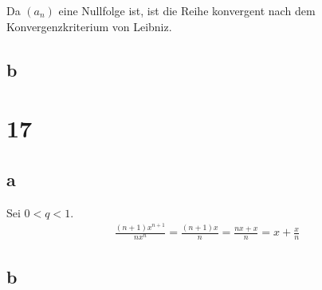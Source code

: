\documentclass[a4paper,10pt]{article}
\begin{document}
Da $(a_n)$ eine Nullfolge ist, ist die Reihe konvergent nach dem Konvergenzkriterium von Leibniz.

\subsection*{b}

\section*{17}

\subsection*{a}

Sei $0 < q < 1$.
\begin{align}
 \frac{(n + 1)x^{n + 1}}{nx^n} = \frac{(n + 1)x}{n} = \frac{nx + x}{n} = x + \frac{x}{n}
\end{align}

\subsection*{b}
\end{document}
